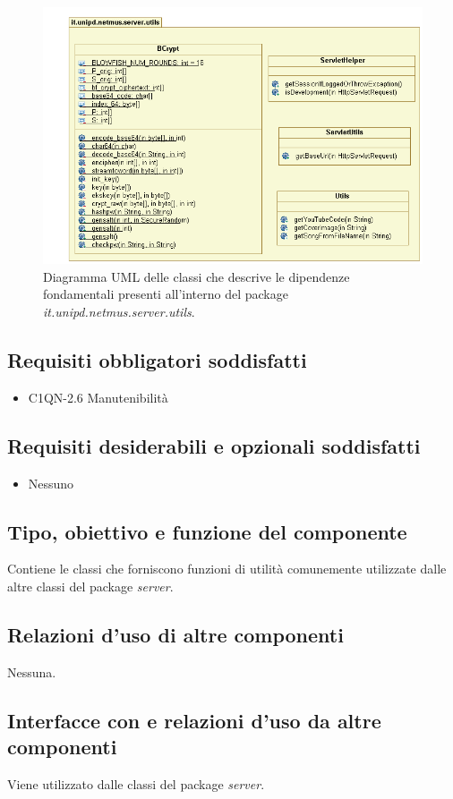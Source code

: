 \begin{figure}[!h]
  \centering
  \includegraphics[width=12cm]{img/DP/classes_server_utils.png}
\caption{Diagramma UML delle classi che descrive le dipendenze
fondamentali presenti all'interno del package
\emph{it.unipd.netmus.server.utils}.}
\end{figure}

\subsection*{Requisiti obbligatori soddisfatti}
\begin{itemize}
    \item C1QN-2.6 Manutenibilit\`a
\end{itemize}
\subsection*{Requisiti desiderabili e opzionali soddisfatti}
\begin{itemize}
    \item Nessuno
\end{itemize}
\subsection*{Tipo, obiettivo e funzione del componente}
Contiene le classi che forniscono funzioni di utilit\`a comunemente utilizzate
dalle altre classi del package \emph{server}.
\subsection*{Relazioni d'uso di altre componenti}
Nessuna.
\subsection*{Interfacce con e relazioni d'uso da altre componenti}
Viene utilizzato dalle classi del package \emph{server}.
